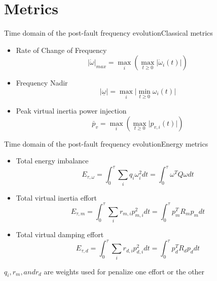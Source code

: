 \documentclass[aspectratio=169, 12pt]{beamer}
\begin{document}
  \section{Metrics}
  \begin{frame}{Time domain of the post-fault frequency evolution}{Classical metrics}
    \begin{itemize}[<+(1)->]
      \item Rate of Change of Frequency
      \begin{equation}
        \lvert \dot{\omega} \rvert _{max} = \max_i\left(\max_{t\ge0}\lvert \dot{\omega}_i(t) \rvert\right)
      \end{equation}
      
      \item Frequency Nadir
      \begin{equation}
        \lvert \underline{\omega} \rvert = \max_i\lvert\min_{t\ge0} \omega_i(t) \rvert
      \end{equation}
      \item Peak virtual inertia power injection
      \begin{equation}
        \bar{p}_v = \max_i\left(\max_{t\ge0}\lvert p_{v,i}(t) \rvert\right)
      \end{equation}
    \end{itemize}
  \end{frame}

  \begin{frame}{Time domain of the post-fault frequency evolution}{Energy metrics}
    \begin{itemize}[<+(1)->]
        \item Total energy imbalance
        \begin{equation}
          E_{\tau,\omega}=\int_{0}^{\tau}\sum_{i} q_i\omega_i^{2}dt=\int_{0}^{\tau} \omega^T Q \omega dt
        \end{equation}
        
        \item Total virtual inertia effort
        \begin{equation}
          E_{\tau,m}=\int_{0}^{\tau}\sum_{i} r_{m,i}p_{m,i}^{2}dt=\int_{0}^{\tau} p_{m}^T R_m p_{m} dt
        \end{equation}

        \item Total virtual damping effort
        \begin{equation}
          E_{\tau,d}=\int_{0}^{\tau}\sum_{i} r_{d,i}p_{d,i}^{2}dt=\int_{0}^{\tau} p_{d}^T R_d p_{d} dt
        \end{equation}
      \end{itemize}

      $q_i, r_m, and r_d$ are weights used for penalize one effort or the other
  \end{frame}
  
\end{document}
